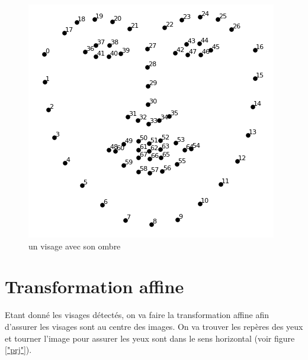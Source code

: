 \documentclass[12pt,french]{report}
\begin{document}
\begin{figure}[H]
    \begin{center}%
		\includegraphics[scale=0.5]{image_rapport/landmarks.png}
		\end{center}%
	\caption{un visage avec son ombre}\label{"landmarks"}%
\end{figure}

\section{Transformation affine }
Etant donné les visages détectés, on va faire la transformation affine afin d'assurer les visages sont au centre des images. On va trouver les repères des yeux et tourner l'image pour assurer les yeux sont dans le sens horizontal (voir figure \ref{"prj"}).
\end{document}
